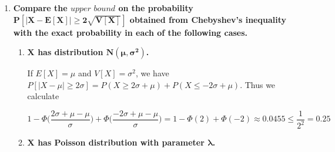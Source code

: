 \documentclass[10pt, oneside]{article}
\begin{document}
\begin{enumerate}[label=9.\arabic*]
We define $L$ as follows:

\[ L = \begin{dcases}
0, & 3.95 \leq D \leq 4.05 \\
0.5, & 3.92 < D < 3.95, 4.05 < D < 4.08 \\
1.0, & D \leq 3.92, D \geq 4.08
\end{dcases}
\]

Thus we calculate

\begin{align*}
E[L] &= 0.5 \bigg[ \bigg( \Phi \bigg( \frac{3.95 - 4}{0.1} \bigg) - \Phi \bigg( \frac{3.92 - 4}{0.1} \bigg) \bigg) + \bigg( \Phi \bigg( \frac{4.08 - 4}{0.1} \bigg) - \Phi \bigg( \frac{4.05 - 4}{0.1} \bigg) \bigg) \bigg] \\
&\quad \quad + \bigg[ \Phi \bigg( \frac{3.92 - 4}{0.1} \bigg) + \bigg( 1 - \Phi \bigg( \frac{4.08 - 4}{0.1} \bigg) \bigg) \bigg] \\
&\approx \boxed{\$ 0.52}
\end{align*}

Note that $P(D \leq 0)$ is effectively 0, which is sensible given that $D$ is a physical metric that must be positive.

\item  \begin{tcolorbox}[
  colback=Cerulean!5!white,
  colframe=Cerulean!75!black]
\textbf{Compare the $\textit{upper bound}$ on the probability $\bm{P[|X - E[X]| \geq 2 \sqrt{V[X]}]}$ obtained from Chebyshev's inequality with the exact probability in each of the following cases.}
\end{tcolorbox}

	\begin{enumerate}
	\item  \begin{tcolorbox}[
	  colback=Cerulean!5!white,
	  colframe=Cerulean!75!black]
	\textbf{$\bm{X}$ has distribution $\bm{N(\mu, \sigma^2)}$.}
	\end{tcolorbox}
	
	If $E[X] = \mu$ and $V[X] = \sigma^2$, we have $P[|X - \mu| \geq 2 \sigma] = P(X \geq 2\sigma + \mu) + P(X \leq -2\sigma + \mu)$. Thus we calculate 
	
	\[ 1 - \Phi \bigg(\frac{2\sigma + \mu - \mu}{\sigma} \bigg) + \Phi \bigg( \frac{-2\sigma + \mu - \mu}{\sigma} \bigg) = 1 - \Phi(2) + \Phi(-2) \approx \boxed{0.0455} \leq \frac{1}{2^2} = 0.25 \]
	
	\item  \begin{tcolorbox}[
	  colback=Cerulean!5!white,
	  colframe=Cerulean!75!black]
	\textbf{$\bm{X}$ has Poisson distribution with parameter $\bm{\lambda}$.}
	\end{tcolorbox}
	

\end{enumerate}
\end{enumerate}
\end{document}
